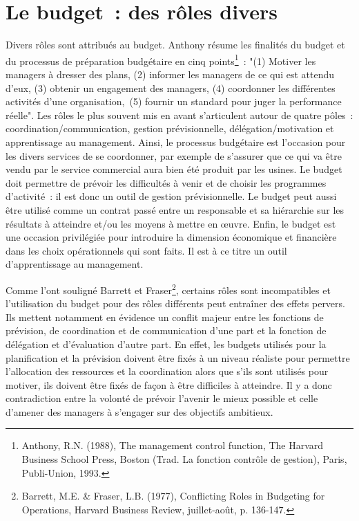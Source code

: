 \documentclass[oneside]{kaobook}
\begin{document}
\section{Le budget : des rôles divers}
\label{sec:org225eec7}
Divers rôles sont attribués au budget. Anthony résume les finalités du budget et du processus de préparation budgétaire en cinq points\footnote{Anthony, R.N. (1988), The management control function, The Harvard Business School Press, Boston (Trad. La fonction contrôle de gestion), Paris, Publi-Union, 1993.} : "(1) Motiver les managers à dresser des plans, (2) informer les managers de ce qui est attendu d'eux, (3) obtenir un engagement des managers, (4) coordonner les différentes activités d'une organisation, (5) fournir un standard pour juger la performance réelle". 
Les rôles le plus souvent mis en avant s'articulent autour de quatre pôles : coordination/communication, gestion prévisionnelle, délégation/motivation et apprentissage au management. Ainsi, le processus budgétaire est l'occasion pour les divers services de se coordonner, par exemple de s'assurer que ce qui va être vendu par le service commercial aura bien été produit par les usines. Le budget doit permettre de prévoir les difficultés à venir et de choisir les programmes d'activité : il est donc un outil de gestion prévisionnelle. Le budget peut aussi être utilisé comme un contrat passé entre un responsable et sa hiérarchie sur les résultats à atteindre et/ou les moyens à mettre en œuvre. Enfin, le budget est une occasion privilégiée pour introduire la dimension économique et financière dans les choix opérationnels qui sont faits. Il est à ce titre un outil d'apprentissage au management.

\begin{kaobox}
Comme l'ont souligné Barrett et Fraser\footnote{Barrett, M.E. \& Fraser, L.B. (1977), Conflicting Roles in Budgeting for Operations, Harvard Business Review, juillet-août, p. 136-147.}, certains rôles sont incompatibles et l'utilisation du budget pour des rôles différents peut entraîner des effets pervers. Ils mettent notamment en évidence un conflit majeur entre les fonctions de prévision, de coordination et de communication d'une part et la fonction de délégation et d'évaluation d'autre part. En effet, les budgets utilisés pour la planification et la prévision doivent être fixés à un niveau réaliste pour permettre l'allocation des ressources et la coordination alors que s'ils sont utilisés pour motiver, ils doivent être fixés de façon à être difficiles à atteindre. Il y a donc contradiction entre la volonté de prévoir l'avenir le mieux possible et celle d'amener des managers à s'engager sur des objectifs ambitieux.
\end{kaobox}
\end{document}

